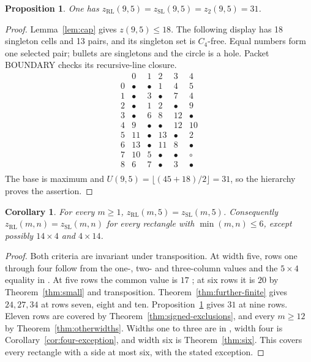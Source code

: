 \documentclass[11pt,a4paper]{article}
\newtheorem{proposition}[theorem]{Proposition}
\newtheorem{corollary}[theorem]{Corollary}
\theoremstyle{definition}
\newcommand{\zr}{z_{\mathrm{RL}}}
\newcommand{\zs}{z_{\mathrm{SL}}}
\newcommand{\zt}{z_2}
\begin{document}
\begin{proposition}\label{prop:nine-five}
One has $\zr(9,5)=\zs(9,5)=\zt(9,5)=31$.
\end{proposition}
\begin{proof}
Lemma~\ref{lem:cap} gives $z(9,5)\le18$. The following display has
18 singleton cells and 13 pairs, and its singleton set is $C_4$-free.
Equal numbers form one selected pair; bullets are singletons and the
circle is a hole. Packet BOUNDARY checks its recursive-line closure.
\[
\begin{array}{c|ccccc}
 &0&1&2&3&4\\\hline
0 & \bullet & \bullet & 1 & 4 & 5\\
1 & \bullet & 3 & \bullet & 7 & 4\\
2 & \bullet & 1 & 2 & \bullet & 9\\
3 & \bullet & 6 & 8 & 12 & \bullet\\
4 & 9 & \bullet & \bullet & 12 & 10\\
5 & 11 & \bullet & 13 & \bullet & 2\\
6 & 13 & \bullet & 11 & 8 & \bullet\\
7 & 10 & 5 & \bullet & \bullet & \circ\\
8 & 6 & 7 & \bullet & 3 & \bullet\\
\end{array}
\]
The base is maximum and $U(9,5)=\lfloor(45+18)/2\rfloor=31$, so the
hierarchy proves the assertion.
\end{proof}

\begin{corollary}\label{cor:five-and-six}
For every $m\ge1$, $\zr(m,5)=\zs(m,5)$. Consequently
$\zr(m,n)=\zs(m,n)$ for every rectangle with $\min(m,n)\le6$, except
possibly $14\times4$ and $4\times14$.
\end{corollary}

\begin{proof}
Both criteria are invariant under transposition. At width five, rows one
through four follow from the one-, two- and three-column values and the
$5\times4$ equality in \cite{LQ,XY}. At five rows the common value is $17$
\cite{LQ,XY}; at six rows it is $20$ by Theorem~\ref{thm:small} and
transposition. Theorem~\ref{thm:further-finite} gives $24,27,34$ at rows
seven, eight and ten. Proposition~\ref{prop:nine-five} gives $31$ at nine
rows. Eleven rows are covered by Theorem~\ref{thm:signed-exclusions},
and every $m\ge12$ by Theorem~\ref{thm:otherwidths}.
Widths one to three are in \cite{LQ}, width four is
Corollary~\ref{cor:four-exception}, and width six is Theorem~\ref{thm:six}.
This covers every rectangle with a side at most six, with the stated
exception.
\end{proof}
\end{document}
